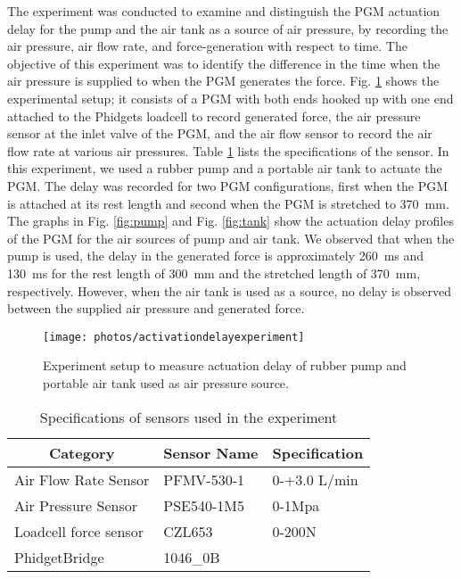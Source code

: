 \documentclass[paper,JRM,paper]{jaciiiarticle}
\begin{document}
The experiment was conducted to examine and distinguish the PGM actuation delay for the pump and the air tank as a source of air pressure, by recording the air pressure, air flow rate, and force-generation with respect to time. The objective of this experiment was to identify the difference in the time when the air pressure is supplied to when the PGM generates the force. Fig. \ref{fig:activationdelayexperiment} shows the experimental setup; it consists of a PGM with both ends hooked up with one end attached to the Phidgets loadcell to record generated force, the air pressure sensor at the inlet valve of the PGM, and the air flow sensor to record the air flow rate at various air pressures. Table \ref{sensordetails} lists the specifications of the sensor. In this experiment, we used a rubber pump and a portable air tank to actuate the PGM. The delay was recorded for two PGM configurations, first when the PGM is attached at its rest length and second when the PGM is stretched to  \SI{370}{\milli\meter}. The graphs in Fig. \ref{fig:pump} and Fig. \ref{fig:tank} show the actuation delay profiles of the PGM for the air sources of pump and air tank. We observed that when the pump is used, the delay in the generated force is approximately \SI{260}{\milli\second} and \SI{130}{\milli\second} for the rest length of \SI{300}{\milli\meter} and the stretched length of \SI{370}{\milli\meter}, respectively. However, when the air tank is used as a source, no delay is observed between the supplied air pressure and generated force.

\begin{figure}
	\centering
	\texttt{[image: photos/activationdelayexperiment]}
	\caption{Experiment setup to measure actuation delay of rubber pump and portable air tank used as air pressure source.}
	\label{fig:activationdelayexperiment}
\end{figure}

\begin{table}[]
	\caption{Specifications of sensors used in the experiment}
	\begin{tabular}{@{}lll@{}}
		\toprule
		\multicolumn{1}{c}{Category} & \multicolumn{1}{c}{Sensor Name} & \multicolumn{1}{c}{Specification} \\ \midrule
		Air Flow Rate Sensor & PFMV-530-1  & 0-+3.0 L/min \\
		Air Pressure Sensor & PSE540-1M5  & 0-1Mpa \\
		Loadcell force sensor & CZL653   & 0-200N \\
		PhidgetBridge & 1046\_0B  &  \\ \bottomrule
	\end{tabular}

	\label{sensordetails}
\end{table}
\end{document}
